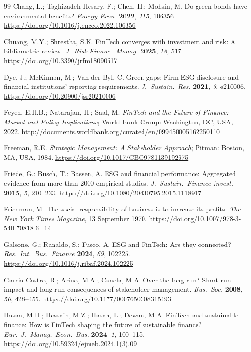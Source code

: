 \documentclass[12pt]{article}
\begin{document}
\begin{thebibliography}{99}
Chang, L.; Taghizadeh-Hesary, F.; Chen, H.; Mohsin, M. Do green bonds have environmental benefits? \textit{Energy Econ.} \textbf{2022}, \textit{115}, 106356. \url{https://doi.org/10.1016/j.eneco.2022.106356}

Chuang, M.Y.; Shrestha, S.K. FinTech converges with investment and risk: A bibliometric review. \textit{J.~Risk Financ.\ Manag.} \textbf{2025}, \textit{18}, 517. \url{https://doi.org/10.3390/jrfm18090517}

Dye, J.; McKinnon, M.; Van der Byl, C. Green gaps: Firm ESG disclosure and financial institutions' reporting requirements. \textit{J.~Sustain.\ Res.} \textbf{2021}, \textit{3}, e210006. \url{https://doi.org/10.20900/jsr20210006}

Feyen, E.H.B.; Natarajan, H.; Saal, M. \textit{FinTech and the Future of Finance: Market and Policy Implications}; World Bank Group: Washington, DC, USA, 2022. \url{http://documents.worldbank.org/curated/en/099450005162250110}

Freeman, R.E. \textit{Strategic Management: A Stakeholder Approach}; Pitman: Boston, MA, USA, 1984. \url{https://doi.org/10.1017/CBO9781139192675}

Friede, G.; Busch, T.; Bassen, A. ESG and financial performance: Aggregated evidence from more than 2000 empirical studies. \textit{J.~Sustain.\ Finance Invest.} \textbf{2015}, \textit{5}, 210--233. \url{https://doi.org/10.1080/20430795.2015.1118917}

Friedman, M. The social responsibility of business is to increase its profits. \textit{The New York Times Magazine}, 13 September 1970. \url{https://doi.org/10.1007/978-3-540-70818-6_14}

Galeone, G.; Ranaldo, S.; Fusco, A. ESG and FinTech: Are they connected? \textit{Res.~Int.\ Bus.\ Finance} \textbf{2024}, \textit{69}, 102225. \url{https://doi.org/10.1016/j.ribaf.2024.102225}

Garcia-Castro, R.; Arino, M.A.; Canela, M.A. Over the long-run? Short-run impact and long-run consequences of stakeholder management. \textit{Bus.~Soc.} \textbf{2008}, \textit{50}, 428--455. \url{https://doi.org/10.1177/0007650308315493}

Hasan, M.H.; Hossain, M.Z.; Hasan, L.; Dewan, M.A. FinTech and sustainable finance: How is FinTech shaping the future of sustainable finance? \textit{Eur.~J.~Manag.\ Econ.\ Bus.} \textbf{2024}, \textit{1}, 100--115. \url{https://doi.org/10.59324/ejmeb.2024.1(3).09}


\end{thebibliography}
\end{document}
